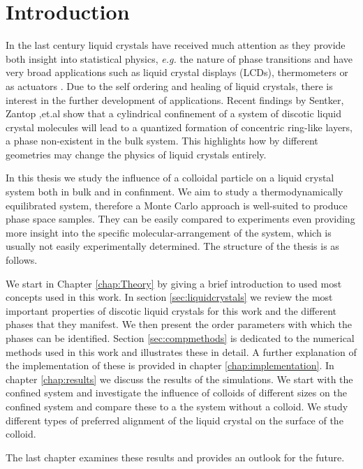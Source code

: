 \chapter{Introduction}
\vspace{2cm}


In the last century liquid crystals have received much attention as they provide both insight into statistical physics, \textit{e.g.} the nature of phase transitions and have very broad applications such as liquid crystal displays (LCDs), thermometers \cite{witonsky2001liquid} or as actuators \cite{guin2018layered}. Due to the self ordering and healing of liquid crystals, there is interest in the further development of applications. Recent findings by Sentker, Zantop ,et.al \cite{sentker2018quantized} show that a cylindrical confinement of a system of discotic liquid crystal molecules will lead to a quantized formation of concentric ring-like layers, a phase non-existent in the bulk system. This highlights how by different geometries may change the physics of liquid crystals entirely.

In this thesis we study the influence of a colloidal particle on a liquid crystal system both in bulk and in confinment.
 We aim to study a thermodynamically equilibrated system, therefore a Monte Carlo approach is well-suited to produce phase space samples. They can be easily compared to experiments even providing more insight into the specific molecular-arrangement of the system, which is usually not easily experimentally determined.
The structure of the thesis is as follows.

We start in Chapter \ref{chap:Theory} by giving a brief introduction to used most concepts used in this work. In section \ref{sec:liquidcrystals} we review the most important properties of discotic liquid crystals for this work and the different phases that they manifest. We then present the order parameters with which the phases can be identified.
Section \ref{sec:compmethods} is dedicated to the numerical methods used in this work and illustrates these in detail. A further explanation of the implementation of these is provided in chapter \ref{chap:implementation}.
In chapter \ref{chap:results} we discuss the results of the simulations. We start with the confined system and investigate the influence of colloids of different sizes on the confined system and compare these to a the system without a colloid. We study different types of preferred  alignment of the liquid crystal on the surface of the colloid.

The last chapter examines these results and provides an outlook for the future. 